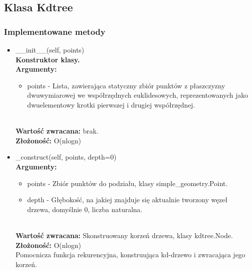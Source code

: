 \documentclass{article}
\begin{document}
        \subsection{Klasa Kdtree}
            \subsubsection{Implementowane metody}
                \begin{itemize}
                    \item \_\_init\_\_(self, points)\\
                        \textbf{Konstruktor klasy.} \\
                        \textbf{Argumenty:} \begin{itemize}
                            \item points - Lista, zawierająca statyczny zbiór punktów z płaszczyzny dwuwymiarowej we współrzędnych euklidesowych, reprezentowanych jako dwuelementowy krotki pierwszej i drugiej współrzędnej.  
                        \end{itemize}\\
                        \textbf{Wartość zwracana:} brak.\\
                        \textbf{Złożoność: } O(nlogn)\\
                        
                    \item \_construct(self, points, depth=0)\\
                        \textbf{Argumenty:} \begin{itemize}
                            \item points - Zbiór punktów do podziału, klasy simple\_geometry.Point.
                            \item depth - Głębokość, na jakiej znajduje się aktualnie tworzony węzeł drzewa, domyślnie 0, liczba naturalna. 
                        \end{itemize}\\
                        \textbf{Wartość zwracana:} Skonstruowany korzeń drzewa, klasy kdtree.Node.\\
                        \textbf{Złożoność: } O(nlogn)\\
                        Pomocnicza funkcja rekurencyjna, konstruująca kd-drzewo i zwracająca jego korzeń. 
                        

\end{itemize}
\end{document}
